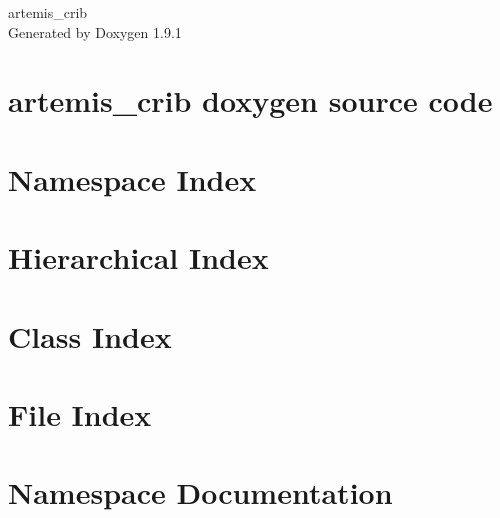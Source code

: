 \let\mypdfximage\pdfximage\def\pdfximage{\immediate\mypdfximage}\documentclass[twoside]{book}
\newcommand{\+}{\discretionary{\mbox{\scriptsize$\hookleftarrow$}}{}{}}
\newcommand{\clearemptydoublepage}{%
  \newpage{\pagestyle{empty}\cleardoublepage}%
}
\begin{document}
\raggedbottom

\hypersetup{pageanchor=false,
             bookmarksnumbered=true,
             pdfencoding=unicode
            }
\begin{titlepage}
\vspace*{7cm}
\begin{center}%
{\Large artemis\+\_\+crib }\\
\vspace*{1cm}
{\large Generated by Doxygen 1.9.1}\\
\end{center}
\end{titlepage}
\clearemptydoublepage
{}
\tableofcontents
\clearemptydoublepage
{}
\hypersetup{pageanchor=true}

\chapter{artemis\+\_\+crib doxygen source code}
\label{index}\hypertarget{index}{}
\chapter{Namespace Index}

\chapter{Hierarchical Index}

\chapter{Class Index}

\chapter{File Index}

\chapter{Namespace Documentation}

\end{document}
